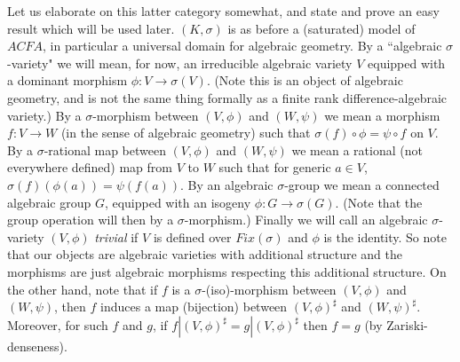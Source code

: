 Let us elaborate on this latter category
somewhat, and state and prove an easy result
which will be used later. $(K,\sigma)$ is as
before a (saturated) model of $ACFA$, in
particular a universal domain for algebraic
geometry.  By a ``algebraic
$\sigma$-variety" we will mean, for now, an
irreducible algebraic variety $V$ equipped
with a dominant morphism
$\phi:V\rightarrow \sigma(V)$. (Note this is
an object of algebraic geometry, and is not
the same thing formally as a finite rank
difference-algebraic variety.) By a
$\sigma$-morphism between
$(V,\phi)$ and $(W,\psi)$ we mean a morphism
$f:V\rightarrow W$ (in the sense of algebraic
geometry) such that
$\sigma(f)\circ\phi = \psi\circ f$ on $V$. By a
$\sigma$-rational map between
$(V,\phi)$ and $(W,\psi)$ we mean a
rational (not everywhere defined) map from $V$
to $W$ such that for generic $a\in V$,
$\sigma(f)(\phi(a)) = \psi(f(a))$. By an
algebraic $\sigma$-group we mean a connected
algebraic group $G$, equipped with an isogeny
$\phi:G\rightarrow \sigma(G)$. (Note that the
group operation will then by a
$\sigma$-morphism.) Finally we will call an
algebraic $\sigma$-variety $(V,\phi)$ {\em
trivial} if $V$ is defined over $Fix(\sigma)$
and
$\phi$ is the identity. So note that our
objects are algebraic varieties with
additional structure and the morphisms are
just algebraic morphisms respecting this
additional structure. On the other hand, note
that if $f$ is a $\sigma$-(iso)-morphism
between $(V,\phi)$ and $(W,\psi)$, then $f$
induces a map (bijection) between
$(V,\phi)^{\sharp}$ and $(W,\psi)^{\sharp}$.
Moreover, for such $f$ and $g$, if
$f|(V,\phi)^{\sharp} = g|(V,\phi)^{\sharp}$
then $f=g$ (by Zariski-denseness).

